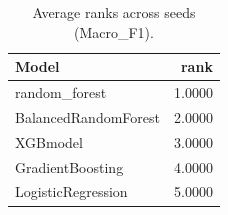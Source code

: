 \begin{table}[t]
\centering
\begin{tabular}{lr}
\toprule
Model & rank \\
\midrule
random_forest & 1.0000 \\
BalancedRandomForest & 2.0000 \\
XGBmodel & 3.0000 \\
GradientBoosting & 4.0000 \\
LogisticRegression & 5.0000 \\
\bottomrule
\end{tabular}
\caption{Average ranks across seeds (Macro_F1).}
\label{tab:avg_rank_Macro_F1}
\end{table}